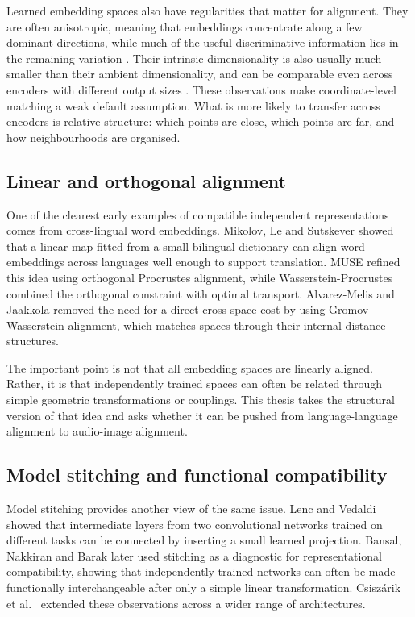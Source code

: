 Learned embedding spaces also have regularities that matter for alignment. They are often anisotropic, meaning that embeddings concentrate along a few dominant directions, while much of the useful discriminative information lies in the remaining variation \cite{ethayarajh2019contextual,mu2018allbutthetop,cai2021isotropy}. Their intrinsic dimensionality is also usually much smaller than their ambient dimensionality, and can be comparable even across encoders with different output sizes \cite{ansuini2019intrinsic,gong2019intrinsic,basile2024idcor}. These observations make coordinate-level matching a weak default assumption. What is more likely to transfer across encoders is relative structure: which points are close, which points are far, and how neighbourhoods are organised.

\subsection{Linear and orthogonal alignment}

One of the clearest early examples of compatible independent representations comes from cross-lingual word embeddings. Mikolov, Le and Sutskever \cite{mikolov2013exploiting} showed that a linear map fitted from a small bilingual dictionary can align word embeddings across languages well enough to support translation. MUSE \cite{conneau2018word} refined this idea using orthogonal Procrustes alignment, while Wasserstein-Procrustes \cite{grave2019unsupervised} combined the orthogonal constraint with optimal transport. Alvarez-Melis and Jaakkola \cite{alvarez2018gromov} removed the need for a direct cross-space cost by using Gromov-Wasserstein alignment, which matches spaces through their internal distance structures.

The important point is not that all embedding spaces are linearly aligned. Rather, it is that independently trained spaces can often be related through simple geometric transformations or couplings. This thesis takes the structural version of that idea and asks whether it can be pushed from language-language alignment to audio-image alignment.

\subsection{Model stitching and functional compatibility}

Model stitching provides another view of the same issue. Lenc and Vedaldi \cite{lenc2015understanding} showed that intermediate layers from two convolutional networks trained on different tasks can be connected by inserting a small learned projection. Bansal, Nakkiran and Barak \cite{bansal2021revisiting} later used stitching as a diagnostic for representational compatibility, showing that independently trained networks can often be made functionally interchangeable after only a simple linear transformation. Csisz{\'a}rik et al.\ \cite{csiszarik2021similarity} extended these observations across a wider range of architectures.

